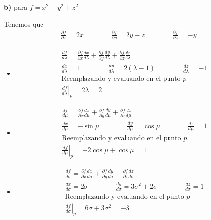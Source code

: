 \documentclass{article}
\begin{document}
\hfill 

\textbf{b) } para $ f = x ^2 + y ^2 + z ^2 $

Tenemos que 
\begin{gather*}
    \frac{\partial f }{\partial x} = 2x \qquad \qquad \frac{\partial f  }{\partial y} = 2y-z \qquad \qquad \frac{\partial f  }{\partial z } = -y  
\end{gather*}

\begin{itemize}
    \item 
        \begin{gather*}
            \frac{d f }{d \lambda} = \frac{\partial f  }{\partial  x } \frac{d x  }{d \lambda} + \frac{\partial f  }{\partial  y } \frac{d y  }{d \lambda} + \frac{\partial f  }{\partial  z } \frac{d z  }{d \lambda} \\
            \frac{d x }{d \lambda} = 1 \qquad \qquad 
            \frac{d y  }{d \lambda} = 2(\lambda-1) \qquad \qquad 
            \frac{d z  }{d \lambda} = -1  \\
            \text{Reemplazando y evaluando en el punto }p\\
            \left. \frac{d f }{d \lambda} \right| _{p} = 2\lambda = 2  
        \end{gather*}
    \item 
        \begin{gather*}
            \frac{d f }{d \mu} = \frac{\partial f  }{\partial  x } \frac{d x  }{d \mu} + \frac{\partial f  }{\partial  y } \frac{d y  }{d \mu} + \frac{\partial f  }{\partial  z } \frac{d z  }{d \mu} \\
            \frac{d x }{d \mu} = -\sin{\mu} \qquad \qquad 
            \frac{d y  }{d \mu} = \cos{\mu} \qquad \qquad 
            \frac{d z  }{d \mu} = 1  \\
            \text{Reemplazando y evaluando en el punto }p\\
            \left. \frac{d f }{d \mu} \right| _{p} = -2 \cos{\mu } + \cos{\mu } = 1  
        \end{gather*}
    \item 
        \begin{gather*}
            \frac{d f }{d \sigma} = \frac{\partial f  }{\partial  x } \frac{d x  }{d \sigma} + \frac{\partial f  }{\partial  y } \frac{d y  }{d \sigma} + \frac{\partial f  }{\partial  z } \frac{d z  }{d \sigma} \\
            \frac{d x }{d \sigma} = 2\sigma \qquad \qquad 
            \frac{d y  }{d \sigma} = 3\sigma^2 + 2 \sigma \qquad \qquad 
            \frac{d z  }{d \sigma} = 1  \\
            \text{Reemplazando y evaluando en el punto }p\\
            \left. \frac{d f }{d \sigma} \right| _{p} = 6\sigma + 3 \sigma^2 = -3 
        \end{gather*}
\end{itemize}
\end{document}
